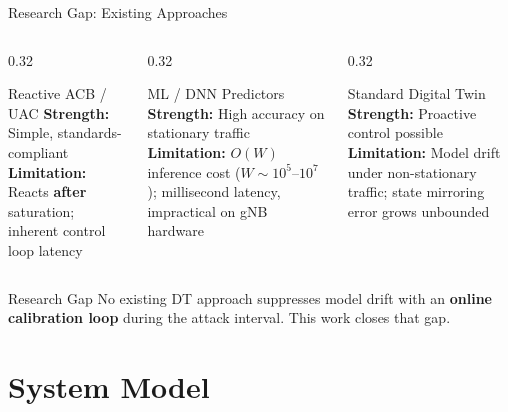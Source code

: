 \documentclass[aspectratio=169,t]{beamer}
\begin{document}
\begin{frame}{Research Gap: Existing Approaches}

  \begin{columns}[T]
    \begin{column}{0.32\textwidth}
      \begin{alertblock}{\small Reactive ACB / UAC}
        \small
        \textbf{Strength:} Simple, standards-compliant\\[4pt]
        \textbf{Limitation:} Reacts \textbf{after} saturation; inherent control loop latency
      \end{alertblock}
    \end{column}

    \begin{column}{0.32\textwidth}
      \begin{alertblock}{\small ML / DNN Predictors}
        \small
        \textbf{Strength:} High accuracy on stationary traffic\\[4pt]
        \textbf{Limitation:} $O(W)$ inference cost ($W\!\sim\!10^5$--$10^7$); millisecond latency, impractical on gNB hardware
      \end{alertblock}
    \end{column}

    \begin{column}{0.32\textwidth}
      \begin{alertblock}{\small Standard Digital Twin}
        \small
        \textbf{Strength:} Proactive control possible\\[4pt]
        \textbf{Limitation:} \alert{Model drift} under non-stationary traffic; state mirroring error grows unbounded
      \end{alertblock}
    \end{column}
  \end{columns}

  \vspace{10pt}
  \begin{exampleblock}{\small Research Gap}
    No existing DT approach suppresses model drift with an \textbf{online calibration loop}
    during the attack interval. This work closes that gap.
  \end{exampleblock}

\end{frame}

\section{System Model}
\end{document}
